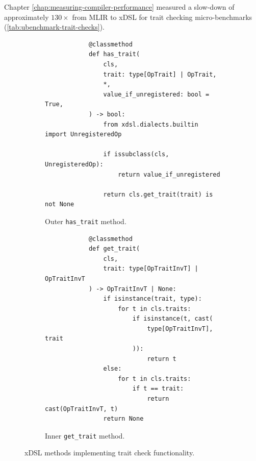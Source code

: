 Chapter \ref{chap:measuring-compiler-performance} measured a slow-down of approximately $130\times$ from MLIR to xDSL for trait checking micro-benchmarks (\autoref{tab:ubenchmark-trait-checks}).

\begin{figure}[H]
    \begin{subfigure}[b]{0.45\textwidth}
       \centering
        \begin{verbatim}
            @classmethod
            def has_trait(
                cls,
                trait: type[OpTrait] | OpTrait,
                *,
                value_if_unregistered: bool = True,
            ) -> bool:
                from xdsl.dialects.builtin import UnregisteredOp

                if issubclass(cls, UnregisteredOp):
                    return value_if_unregistered

                return cls.get_trait(trait) is not None
        \end{verbatim}
        \footnotesize\vspace{1.5em}
        \caption{Outer \texttt{has_trait} method.}
        \label{listing:ubenchmark-trait-checks-xdsl-has}
    \end{subfigure}
    \hfill
    \begin{subfigure}[b]{0.45\textwidth}
        \centering
        \begin{verbatim}
            @classmethod
            def get_trait(
                cls,
                trait: type[OpTraitInvT] | OpTraitInvT
            ) -> OpTraitInvT | None:
                if isinstance(trait, type):
                    for t in cls.traits:
                        if isinstance(t, cast(
                            type[OpTraitInvT], trait
                        )):
                            return t
                else:
                    for t in cls.traits:
                        if t == trait:
                            return cast(OpTraitInvT, t)
                return None
        \end{verbatim}
        \caption{Inner \texttt{get_trait} method.}
        \label{listing:ubenchmark-trait-checks-xdsl-get}
    \end{subfigure}
    \vspace{1em}
    \captionsetup{name=Listing}
    \caption{xDSL methods implementing trait check functionality.}
    \label{listing:ubenchmark-trait-checks-xdsl}
\end{figure}

